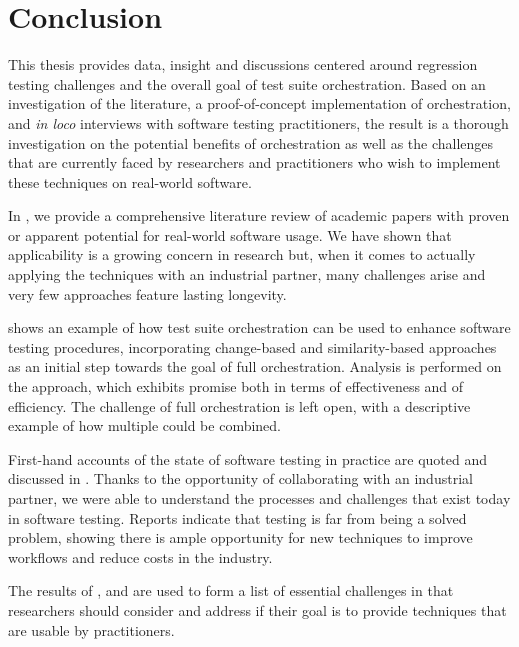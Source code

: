 \chapter{Conclusion}\label{chap:conclusion}

This thesis provides data, insight and discussions centered around regression testing challenges and the overall goal of test suite orchestration.
Based on an investigation of the literature, a proof-of-concept implementation of orchestration, and \textit{in loco} interviews with software testing practitioners,
the result is a thorough investigation on the potential benefits of orchestration as well as the challenges that are currently faced by researchers and practitioners who wish to implement these techniques on real-world software.

In , we provide a comprehensive literature review of academic papers with proven or apparent potential for real-world software usage.
We have shown that applicability is a growing concern in research but, when it comes to actually applying the techniques with an industrial partner, many challenges arise and very few approaches feature lasting longevity.

 shows an example of how test suite orchestration can be used to enhance software testing procedures, incorporating change-based \tcs and similarity-based \tcp  approaches as an initial step towards the goal of full orchestration.
Analysis is performed on the approach, which exhibits promise both in terms of effectiveness and of efficiency.
The challenge of full orchestration is left open, with a descriptive example of how multiple \rt could be combined.

First-hand accounts of the state of software testing in practice are quoted and discussed in .
Thanks to the opportunity of collaborating with an industrial partner, we were able to understand the processes and challenges that exist today in software testing.
Reports indicate that testing is far from being a solved problem, showing there is ample opportunity for new techniques to improve workflows and reduce costs in the industry.

The results of ,  and  are used to form a list of essential challenges in  that researchers should consider and address if their goal is to provide techniques that are usable by practitioners.


